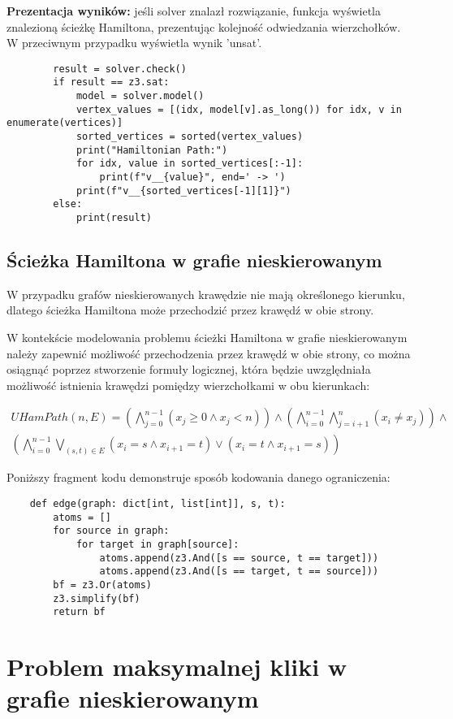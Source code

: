\textbf{Prezentacja wyników: } jeśli solver znalazł rozwiązanie, funkcja wyświetla znalezioną ścieżkę Hamiltona, prezentując kolejność odwiedzania wierzchołków. W przeciwnym przypadku wyświetla wynik 'unsat'.

\begin{lstlisting}
		result = solver.check()
		if result == z3.sat:
			model = solver.model()
			vertex_values = [(idx, model[v].as_long()) for idx, v in enumerate(vertices)]
			sorted_vertices = sorted(vertex_values)
			print("Hamiltonian Path:")
			for idx, value in sorted_vertices[:-1]:
				print(f"v__{value}", end=' -> ')
			print(f"v__{sorted_vertices[-1][1]}")
		else:
			print(result)
\end{lstlisting}


\subsection{Ścieżka Hamiltona w grafie nieskierowanym}

W przypadku grafów nieskierowanych krawędzie nie mają określonego kierunku, dlatego ścieżka Hamiltona może przechodzić przez krawędź w obie strony. 

W kontekście modelowania problemu ścieżki Hamiltona w grafie nieskierowanym należy zapewnić możliwość przechodzenia przez krawędź w obie strony, co można osiągnąć poprzez stworzenie formuły logicznej, która będzie uwzględniała możliwość istnienia krawędzi pomiędzy wierzchołkami w obu kierunkach:

\begin{align*}
	UHamPath(n, E) = \left( \bigwedge_{j=0}^{n-1} (x_j \geq 0 \land x_j < n) \right) \land 
	\left( \bigwedge_{i=0}^{n-1} \bigwedge_{j=i+1}^{n} (x_i \neq x_j) \right) \land \\
	\left( \bigwedge_{i=0}^{n-1} \bigvee_{(s,t) \in E} (x_i = s \land x_{i+1} = t) \lor (x_i = t \land x_{i+1} = s) \right)
\end{align*}

Poniższy fragment kodu demonstruje sposób kodowania danego ograniczenia:

\begin{lstlisting}
	def edge(graph: dict[int, list[int]], s, t):
		atoms = []
		for source in graph:
			for target in graph[source]:
				atoms.append(z3.And([s == source, t == target])) 
				atoms.append(z3.And([s == target, t == source]))
		bf = z3.Or(atoms)
		z3.simplify(bf)
		return bf
\end{lstlisting}

\section{Problem maksymalnej kliki w grafie nieskierowanym}

